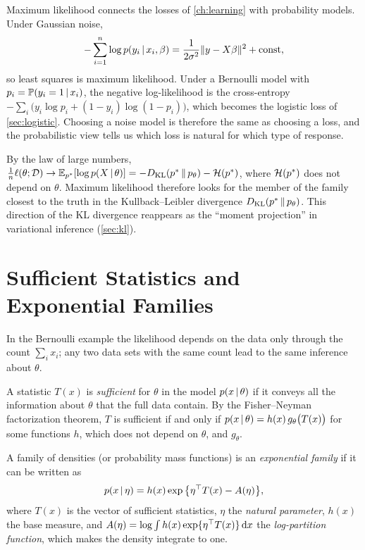 \begin{remark}\label{rem:nll-loss}
Maximum likelihood connects the losses of \cref{ch:learning} with probability models. Under Gaussian noise,
\[
-\sum_{i=1}^n\log p(y_i\,|\, x_i,\beta)=\frac{1}{2\sigma^2}\lVert y-X\beta\rVert^2+\text{const},
\]
so least squares is maximum likelihood. Under a Bernoulli model with $p_i=\mathbb{P}(y_i=1\,|\, x_i)$, the negative log-likelihood is the cross-entropy $-\sum_i\big(y_i\log p_i+(1-y_i)\log(1-p_i)\big)$, which becomes the logistic loss of \cref{sec:logistic}. Choosing a noise model is therefore the same as choosing a loss, and the probabilistic view tells us which loss is natural for which type of response.
\end{remark}

\begin{remark}\label{rem:mle-kl}
By the law of large numbers, $\frac1n\ell(\theta;\mathcal{D})\to\mathbb{E}_{p^*}[\log p(X\,|\,\theta)]=-D_{\mathrm{KL}}(p^*\,\|\,p_\theta)-\mathcal{H}(p^*)$, where $\mathcal{H}(p^*)$ does not depend on $\theta$. Maximum likelihood therefore looks for the member of the family closest to the truth in the Kullback--Leibler divergence $D_{\mathrm{KL}}(p^*\,\|\,p_\theta)$. This direction of the KL divergence reappears as the ``moment projection'' in variational inference (\cref{sec:kl}).
\end{remark}

\section{Sufficient Statistics and Exponential Families}\label{sec:expfam}

In the Bernoulli example the likelihood depends on the data only through the count $\sum_ix_i$; any two data sets with the same count lead to the same inference about $\theta$.

\begin{definition}\label{def:sufficient}
A statistic $T(x)$ is \emph{sufficient} for $\theta$ in the model $p(x\,|\,\theta)$ if it conveys all the information about $\theta$ that the full data contain. By the Fisher--Neyman factorization theorem, $T$ is sufficient if and only if $p(x\,|\,\theta)=h(x)\,g_\theta\big(T(x)\big)$ for some functions $h$, which does not depend on $\theta$, and $g_\theta$.
\end{definition}

\begin{definition}\label{def:expfam}
A family of densities (or probability mass functions) is an \emph{exponential family} if it can be written as
\[
p(x\,|\,\eta)=h(x)\exp\big\{\eta^{\top} T(x)-A(\eta)\big\},
\]
where $T(x)$ is the vector of sufficient statistics, $\eta$ the \emph{natural parameter}, $h(x)$ the base measure, and $A(\eta)=\log\int h(x)\exp\{\eta^{\top} T(x)\}\,\mathrm{d} x$ the \emph{log-partition function}, which makes the density integrate to one.
\end{definition}

